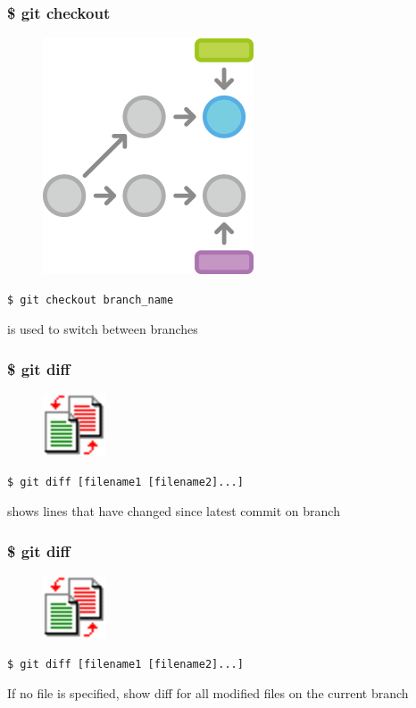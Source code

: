 \documentclass{beamer}
\begin{document}
\begin{frame}[fragile]
    \frametitle{\$ git checkout}
    \begin{figure}[h!]
        \begin{center}
            \includegraphics[scale=0.5]{checkout.png}
        \end{center}
    \end{figure}
    \begin{verbatim}
$ git checkout branch_name
    \end{verbatim}
    is used to switch between branches
\end{frame}

\begin{frame}[fragile]
    \frametitle{\$ git diff}
    \begin{figure}[h!]
        \begin{center}
            \includegraphics[scale=1.2]{diff.png}
        \end{center}
    \end{figure}
    \begin{verbatim}
$ git diff [filename1 [filename2]...]
    \end{verbatim}
    shows lines that have changed since latest commit on branch
\end{frame}

\begin{frame}[fragile]
    \frametitle{\$ git diff}
    \begin{figure}[h!]
        \begin{center}
            \includegraphics[scale=1.2]{diff.png}
        \end{center}
    \end{figure}
    \begin{verbatim}
$ git diff [filename1 [filename2]...]
    \end{verbatim}
    If no file is specified, show diff for all modified files on the current branch
\end{frame}
\end{document}
